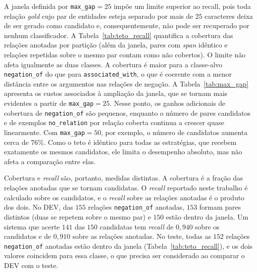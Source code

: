 A janela definida por \texttt{max\_gap}$=25$ impõe um limite superior ao recall, pois toda relação \emph{gold} cujo par de entidades esteja separado por mais de $25$ caracteres deixa de ser gerado como candidato e, consequentemente, não pode ser recuperado por nenhum classificador. A Tabela~\ref{tab:teto_recall} quantifica a
cobertura das relações anotadas por partição (além da janela, pares com \emph{span}
idêntico e relações repetidas sobre o mesmo par contam como não cobertos). O limite não afeta igualmente as duas classes. A cobertura é maior para a classe-alvo \texttt{negation\_of} do que para \texttt{associated\_with}, o que é coerente com a menor distância entre os argumentos nas relações de negação. A Tabela~\ref{tab:max_gap} apresenta os custos associados à ampliação da janela, que se tornam mais evidentes a partir de \texttt{max\_gap}$=25$. Nesse ponto, os ganhos adicionais de cobertura de \texttt{negation\_of} são pequenos, enquanto o número de pares candidatos e de exemplos \texttt{no\_relation} por relação coberta continua a crescer quase linearmente. Com \texttt{max\_gap}$=50$, por exemplo, o número de candidatos aumenta cerca de 76\%. Como o teto é idêntico
para todas as estratégias, que recebem exatamente os mesmos candidatos, ele limita o
desempenho absoluto, mas não afeta a comparação entre elas.





Cobertura e \emph{recall} são, portanto, medidas distintas. A cobertura é a fração das
relações anotadas que se tornam candidatas. O \emph{recall} reportado neste trabalho é
calculado sobre os candidatos, e o \emph{recall} sobre as relações anotadas é o
produto dos dois. No DEV, das $155$ relações \texttt{negation\_of} anotadas, $153$
formam pares distintos (duas se repetem sobre o mesmo par) e $150$ estão dentro da
janela. Um sistema que acerte $141$ das $150$ candidatas tem \emph{recall} de
$0{,}940$ sobre os candidatos e de $0{,}910$ sobre as relações anotadas. No teste,
todas as $152$ relações \texttt{negation\_of} anotadas estão dentro da janela
(Tabela~\ref{tab:teto_recall}), e os dois valores coincidem para essa classe, o que
precisa ser considerado ao comparar o DEV com o teste.


